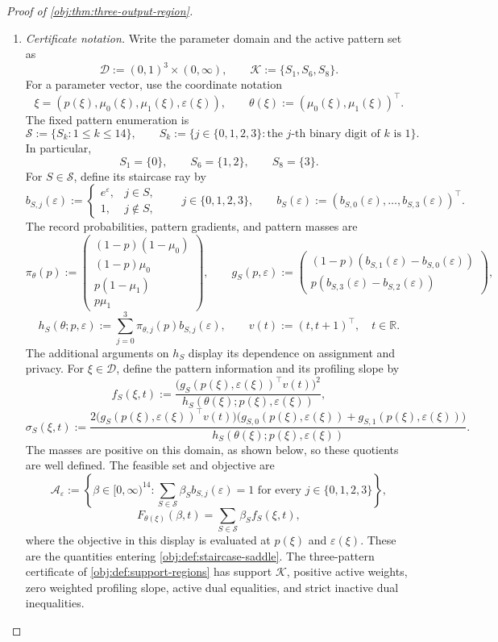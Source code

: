 \documentclass[11pt]{article}
\begin{document}
\begin{proof}[Proof of \cref{obj:thm:three-output-region}]
\begin{enumerate}
\item \textit{Certificate notation.}
Write the parameter domain and the active pattern set as
\[
\mathcal D:=(0,1)^3\times(0,\infty),
\qquad
\mathcal K:=\{S_1,S_6,S_8\}.
\]
For a parameter vector, use the coordinate notation
\[
\xi=(p(\xi),\mu_0(\xi),\mu_1(\xi),\varepsilon(\xi)),
\qquad
\theta(\xi):=(\mu_0(\xi),\mu_1(\xi))^\top.
\]
The fixed pattern enumeration is
\[
\mathcal S:=\{S_k:1\le k\le14\},
\qquad
S_k:=\{j\in\{0,1,2,3\}:\text{the \(j\)-th binary digit of \(k\) is \(1\)}\}.
\]
In particular,
\[
S_1=\{0\},\qquad S_6=\{1,2\},\qquad S_8=\{3\}.
\]
For \(S\in\mathcal S\), define its staircase ray by
\[
b_{S,j}(\varepsilon):=
\begin{cases}
e^\varepsilon,&j\in S,\\
1,&j\notin S,
\end{cases}
\qquad j\in\{0,1,2,3\},
\qquad
b_S(\varepsilon):=
(b_{S,0}(\varepsilon),\ldots,b_{S,3}(\varepsilon))^\top.
\]
The record probabilities, pattern gradients, and pattern masses are
\[
\pi_\theta(p):=
\begin{pmatrix}
(1-p)(1-\mu_0)\\
(1-p)\mu_0\\
p(1-\mu_1)\\
p\mu_1
\end{pmatrix},
\qquad
g_S(p,\varepsilon):=
\begin{pmatrix}
(1-p)(b_{S,1}(\varepsilon)-b_{S,0}(\varepsilon))\\
p(b_{S,3}(\varepsilon)-b_{S,2}(\varepsilon))
\end{pmatrix},
\]
\[
h_S(\theta;p,\varepsilon):=
\sum_{j=0}^3\pi_{\theta,j}(p)b_{S,j}(\varepsilon),
\qquad
v(t):=(t,t+1)^\top,\quad t\in\mathbb R.
\]
The additional arguments on \(h_S\) display its dependence on assignment and privacy. For \(\xi\in\mathcal D\), define the pattern information and its profiling slope by
\[
f_S(\xi,t):=
\frac{\bigl(g_S(p(\xi),\varepsilon(\xi))^\top v(t)\bigr)^2}
{h_S(\theta(\xi);p(\xi),\varepsilon(\xi))},
\]
\[
\sigma_S(\xi,t):=
\frac{
2\bigl(g_S(p(\xi),\varepsilon(\xi))^\top v(t)\bigr)
\bigl(g_{S,0}(p(\xi),\varepsilon(\xi))
      +g_{S,1}(p(\xi),\varepsilon(\xi))\bigr)}
{h_S(\theta(\xi);p(\xi),\varepsilon(\xi))}.
\]
The masses are positive on this domain, as shown below, so these quotients are well defined. The feasible set and objective are
\[
\mathcal A_\varepsilon:=
\left\{\beta\in[0,\infty)^{14}:
\sum_{S\in\mathcal S}\beta_S b_{S,j}(\varepsilon)=1
\text{ for every }j\in\{0,1,2,3\}\right\},
\]
\[
F_{\theta(\xi)}(\beta,t)
=\sum_{S\in\mathcal S}\beta_S f_S(\xi,t),
\]
where the objective in this display is evaluated at \(p(\xi)\) and \(\varepsilon(\xi)\). These are the quantities entering \cref{obj:def:staircase-saddle}. The three-pattern certificate of \cref{obj:def:support-regions} has support \(\mathcal K\), positive active weights, zero weighted profiling slope, active dual equalities, and strict inactive dual inequalities.


\end{enumerate}
\end{proof}
\end{document}
